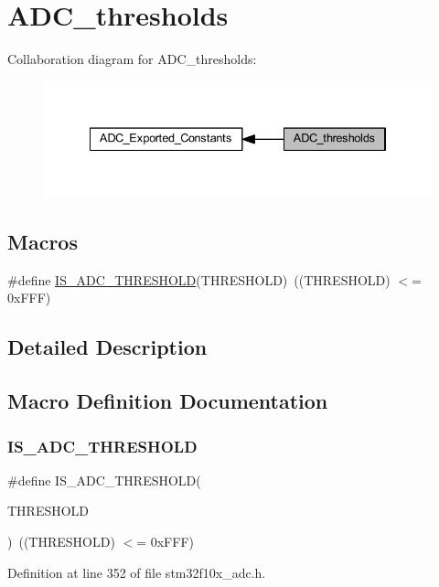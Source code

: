 \hypertarget{group___a_d_c__thresholds}{}\section{A\+D\+C\+\_\+thresholds}
\label{group___a_d_c__thresholds}
Collaboration diagram for A\+D\+C\+\_\+thresholds\+:
\nopagebreak
\begin{figure}[H]
\begin{center}
\leavevmode
\includegraphics[width=334pt]{group___a_d_c__thresholds}
\end{center}
\end{figure}
\subsection*{Macros}
\begin{DoxyCompactItemize}
\item 
\#define \hyperlink{group___a_d_c__thresholds_gaa71cdff6dafddfccff8a7e88768bfb54}{I\+S\+\_\+\+A\+D\+C\+\_\+\+T\+H\+R\+E\+S\+H\+O\+LD}(T\+H\+R\+E\+S\+H\+O\+LD)~((T\+H\+R\+E\+S\+H\+O\+LD) $<$= 0x\+F\+F\+F)
\end{DoxyCompactItemize}


\subsection{Detailed Description}


\subsection{Macro Definition Documentation}
\mbox{\label{group___a_d_c__thresholds_gaa71cdff6dafddfccff8a7e88768bfb54}} 
\subsubsection{\texorpdfstring{I\+S\+\_\+\+A\+D\+C\+\_\+\+T\+H\+R\+E\+S\+H\+O\+LD}{IS\_ADC\_THRESHOLD}}
{\footnotesize\ttfamily \#define I\+S\+\_\+\+A\+D\+C\+\_\+\+T\+H\+R\+E\+S\+H\+O\+LD(\begin{DoxyParamCaption}\item[{}]{T\+H\+R\+E\+S\+H\+O\+LD }\end{DoxyParamCaption})~((T\+H\+R\+E\+S\+H\+O\+LD) $<$= 0x\+F\+F\+F)}



Definition at line 352 of file stm32f10x\+\_\+adc.\+h.

